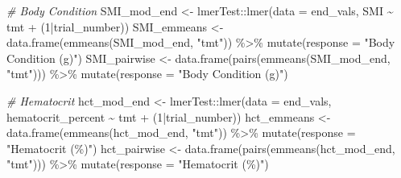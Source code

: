 \documentclass[
]{article}
\newenvironment{Shaded}{\begin{snugshade}}{\end{snugshade}}
\newcommand{\AttributeTok}[1]{\textcolor[rgb]{0.77,0.63,0.00}{#1}}
\newcommand{\CommentTok}[1]{\textcolor[rgb]{0.56,0.35,0.01}{\textit{#1}}}
\newcommand{\DecValTok}[1]{\textcolor[rgb]{0.00,0.00,0.81}{#1}}
\newcommand{\FunctionTok}[1]{\textcolor[rgb]{0.00,0.00,0.00}{#1}}
\newcommand{\NormalTok}[1]{#1}
\newcommand{\OtherTok}[1]{\textcolor[rgb]{0.56,0.35,0.01}{#1}}
\newcommand{\SpecialCharTok}[1]{\textcolor[rgb]{0.00,0.00,0.00}{#1}}
\newcommand{\StringTok}[1]{\textcolor[rgb]{0.31,0.60,0.02}{#1}}
\begin{document}
\begin{Shaded}
\begin{Highlighting}[]
\CommentTok{\# Body Condition}
\NormalTok{SMI\_mod\_end }\OtherTok{\textless{}{-}}\NormalTok{ lmerTest}\SpecialCharTok{::}\FunctionTok{lmer}\NormalTok{(}\AttributeTok{data =}\NormalTok{ end\_vals,}
\NormalTok{                              SMI }\SpecialCharTok{\textasciitilde{}}\NormalTok{ tmt }\SpecialCharTok{+} 
\NormalTok{                              (}\DecValTok{1}\SpecialCharTok{|}\NormalTok{trial\_number))}
\NormalTok{SMI\_emmeans }\OtherTok{\textless{}{-}} \FunctionTok{data.frame}\NormalTok{(}\FunctionTok{emmeans}\NormalTok{(SMI\_mod\_end, }\StringTok{"tmt"}\NormalTok{)) }\SpecialCharTok{\%\textgreater{}\%}
  \FunctionTok{mutate}\NormalTok{(}\AttributeTok{response =} \StringTok{"Body Condition (g\textquotesingle{})"}\NormalTok{)}
\NormalTok{SMI\_pairwise }\OtherTok{\textless{}{-}} \FunctionTok{data.frame}\NormalTok{(}\FunctionTok{pairs}\NormalTok{(}\FunctionTok{emmeans}\NormalTok{(SMI\_mod\_end, }\StringTok{"tmt"}\NormalTok{))) }\SpecialCharTok{\%\textgreater{}\%}
  \FunctionTok{mutate}\NormalTok{(}\AttributeTok{response =} \StringTok{"Body Condition (g\textquotesingle{})"}\NormalTok{)}

\CommentTok{\# Hematocrit}
\NormalTok{hct\_mod\_end }\OtherTok{\textless{}{-}}\NormalTok{ lmerTest}\SpecialCharTok{::}\FunctionTok{lmer}\NormalTok{(}\AttributeTok{data =}\NormalTok{ end\_vals,}
\NormalTok{                              hematocrit\_percent }\SpecialCharTok{\textasciitilde{}}\NormalTok{ tmt }\SpecialCharTok{+} 
\NormalTok{                              (}\DecValTok{1}\SpecialCharTok{|}\NormalTok{trial\_number))}
\NormalTok{hct\_emmeans }\OtherTok{\textless{}{-}} \FunctionTok{data.frame}\NormalTok{(}\FunctionTok{emmeans}\NormalTok{(hct\_mod\_end, }\StringTok{"tmt"}\NormalTok{)) }\SpecialCharTok{\%\textgreater{}\%}
  \FunctionTok{mutate}\NormalTok{(}\AttributeTok{response =} \StringTok{"Hematocrit (\%)"}\NormalTok{)}
\NormalTok{hct\_pairwise }\OtherTok{\textless{}{-}} \FunctionTok{data.frame}\NormalTok{(}\FunctionTok{pairs}\NormalTok{(}\FunctionTok{emmeans}\NormalTok{(hct\_mod\_end, }\StringTok{"tmt"}\NormalTok{))) }\SpecialCharTok{\%\textgreater{}\%}
  \FunctionTok{mutate}\NormalTok{(}\AttributeTok{response =} \StringTok{"Hematocrit (\%)"}\NormalTok{)}


\end{Highlighting}
\end{Shaded}
\end{document}
